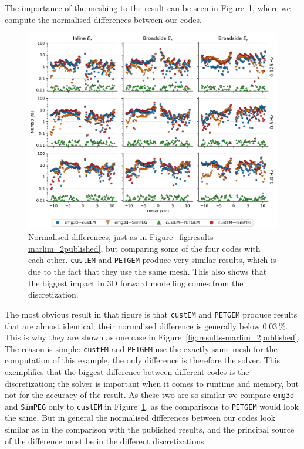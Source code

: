 \documentclass[extra, camera,%
]{gji}
\newlength{\fwidth}
\newcommand{\emg}[2]{\texttt{emg#1#2}\xspace}
\newcommand{\simpeg}{\texttt{SimPEG}\xspace}
\newcommand{\custem}{\texttt{custEM}\xspace}
\newcommand{\petgem}{\texttt{PETGEM}\xspace}
\begin{document}
The importance of the meshing to the result can be seen in Figure~\ref{fig:results-marlim_2ours}, where we compute the normalised differences between our codes.
%
\begin{figure}
  \centering
  \includegraphics[width=.9\fwidth]{figures/results-marlim_2ours.png}
  \caption{Normalised differences, just as in Figure~\ref{fig:results-marlim_2published}, but comparing some of the four codes with each other. \custem and \petgem produce very similar results, which is due to the fact that they use the same mesh. This also shows that the biggest impact in 3D forward modelling comes from the discretization.}
  \label{fig:results-marlim_2ours}
\end{figure}
%
The most obvious result in that figure is that \custem and \petgem produce results that are almost identical, their normalised difference is generally below 0.03\,\%. This is why they are shown as one case in Figure~\ref{fig:results-marlim_2published}. The reason is simple: \custem and \petgem use the exactly same mesh for the computation of this example, the only difference is therefore the solver. This exemplifies that the biggest difference between different codes is the discretization; the solver is important when it comes to runtime and memory, but not for the accuracy of the result. As these two are so similar we compare \emg3d and \simpeg only to \custem in Figure~\ref{fig:results-marlim_2ours}, as the comparisons to \petgem would look the same. But in general the normalised differences between our codes look similar as in the comparison with the published results, and the principal source of the difference must be in the different discretizations.
\end{document}
